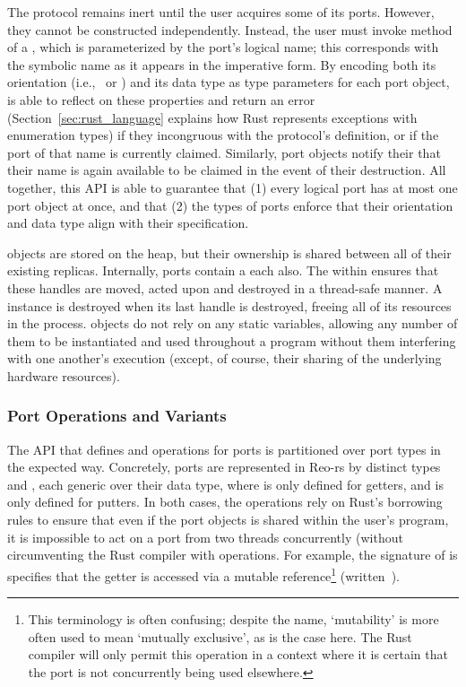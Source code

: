 The protocol remains inert until the user acquires some of its ports. However, they cannot be constructed independently. Instead, the user must invoke  method of a , which is parameterized by the port's logical name; this corresponds with the symbolic name as it appears in the imperative form. By encoding both its orientation (i.e.,\  or ) and its data type as type parameters for each port object,  is able to reflect on these properties and return an error (Section~\ref{sec:rust_language} explains how Rust represents exceptions with enumeration types) if they incongruous with the protocol's definition, or if the port of that name is currently claimed. Similarly, port objects notify their  that their name is again available to be claimed in the event of their destruction. All together, this API is able to guarantee that (1) every logical port has at most one port object at once, and that (2) the types of ports enforce that their orientation and data type align with their specification.

 objects are stored on the heap, but their ownership is shared between all of their existing  replicas. Internally, ports contain a  each also. The  within ensures that these handles are moved, acted upon and destroyed in a thread-safe manner. A  instance is destroyed when its last handle is destroyed, freeing all of its resources in the process.  objects do not rely on any static variables, allowing any number of them to be instantiated and used throughout a program without them interfering with one another's execution (except, of course, their sharing of the underlying hardware resources). 

\subsubsection{Port Operations and Variants}
\label{sec:port_operations}
The API that defines  and  operations for ports is partitioned over port types in the expected way. Concretely, ports are represented in Reo-rs by distinct types  and , each generic over their data type, where  is only defined for getters, and  is only defined for putters. In both cases, the operations rely on Rust's borrowing rules to ensure that even if the port objects is shared within the user's program, it is impossible to act on a port from two threads concurrently (without circumventing the Rust compiler with  operations. For example, the signature of  is specifies that the getter is accessed via a mutable reference\footnote{This terminology is often confusing; despite the name, `mutability' is more often used to mean `mutually exclusive', as is the case here. The Rust compiler will only permit this operation in a context where it is certain that the port is not concurrently being used elsewhere.} (written~).

